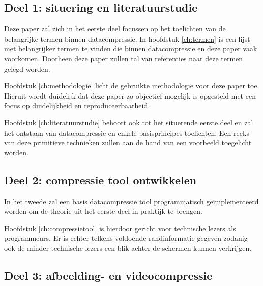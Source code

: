 
\subsection{Deel 1: situering en literatuurstudie}
\label{sec:opzet-bachelorproef-deel-1}

Deze paper zal zich in het eerste deel focussen op het toelichten van de belangrijke termen binnen \gls{datacompressie}. In hoofdstuk \ref{ch:termen} is een lijst met belangrijker termen te vinden die binnen \gls{datacompressie} en deze paper vaak voorkomen. Doorheen deze paper zullen tal van referenties naar deze termen gelegd worden. 

Hoofdstuk \ref{ch:methodologie} licht de gebruikte methodologie voor deze paper toe. Hieruit wordt duidelijk dat deze paper zo objectief mogelijk is opgesteld met een focus op duidelijkheid en reproduceerbaarheid.

Hoofdstuk \ref{ch:literatuurstudie} behoort ook tot het situerende eerste deel en zal het ontstaan van \gls{datacompressie} en enkele basisprincipes toelichten. Een reeks van deze primitieve technieken zullen aan de hand van een voorbeeld toegelicht worden.

\subsection{Deel 2: compressie tool ontwikkelen}
\label{sec:opzet-bachelorproef-deel-2}
 
 In het tweede zal een basis \gls{datacompressie} tool programmatisch geïmplementeerd worden om de theorie uit het eerste deel in praktijk te brengen.
 
Hoofdstuk \ref{ch:compressietool} is hierdoor gericht voor technische lezers als programmeurs. Er is echter telkens voldoende randinformatie gegeven zodanig ook de minder technische lezers een blik achter de schermen kunnen verkrijgen.

\subsection{Deel 3: afbeelding- en videocompressie}
\label{sec:opzet-bachelorproef-deel-3}

